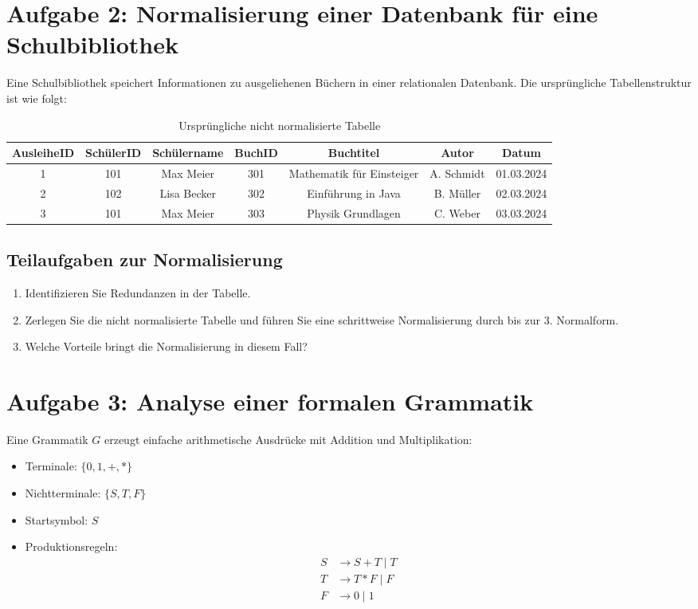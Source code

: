 \documentclass[a4paper,12pt]{article}
\begin{document}
	\section*{Aufgabe 2: Normalisierung einer Datenbank für eine Schulbibliothek}
	
	Eine Schulbibliothek speichert Informationen zu ausgeliehenen Büchern in einer relationalen Datenbank. Die ursprüngliche Tabellenstruktur ist wie folgt:
	
	\begin{table}[h]
		\centering
		\caption{Ursprüngliche nicht normalisierte Tabelle}
		\begin{tabular}{|c|c|c|c|c|c|c|}
			\hline
			AusleiheID & SchülerID & Schülername & BuchID & Buchtitel & Autor & Datum \\
			\hline
			1 & 101 & Max Meier & 301 & Mathematik für Einsteiger & A. Schmidt & 01.03.2024 \\
			2 & 102 & Lisa Becker & 302 & Einführung in Java & B. Müller & 02.03.2024 \\
			3 & 101 & Max Meier & 303 & Physik Grundlagen & C. Weber & 03.03.2024 \\
			\hline
		\end{tabular}
	\end{table}
	
	\subsection*{Teilaufgaben zur Normalisierung}
	\begin{enumerate}
		\item Identifizieren Sie Redundanzen in der Tabelle.
		\item Zerlegen Sie die nicht normalisierte Tabelle und führen Sie eine schrittweise Normalisierung durch bis zur 3. Normalform.
		\item Welche Vorteile bringt die Normalisierung in diesem Fall?
	\end{enumerate}
	
	\section*{Aufgabe 3: Analyse einer formalen Grammatik}
Eine Grammatik \( G \) erzeugt einfache arithmetische Ausdrücke mit Addition und Multiplikation:
\begin{itemize}
	\item Terminale: \( \{0, 1, +, *\} \)
	\item Nichtterminale: \( \{S, T, F\} \)
	\item Startsymbol: \( S \)
	\item Produktionsregeln:
	\begin{align*}
		S &\to S + T \mid T \\
		T &\to T * F \mid F \\
		F &\to 0 \mid 1
	\end{align*}
\end{itemize}
	
\end{document}
